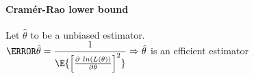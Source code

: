 \paragraph{Cramér-Rao lower bound} 
Let $\hat{\theta}$ to be a unbiased estimator.\\ 
$
\V{\hat{\theta}} = \dfrac{1}{\E{\left[\frac{\partial~ln\left(L(\theta)\right)}{\partial\theta}\right]^{2}}}
\Rightarrow
\hat{\theta}
$
is an efficient estimator
